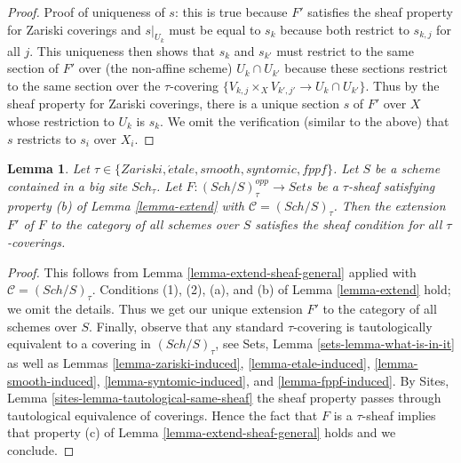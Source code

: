 \documentclass{stacks-project}
\theoremstyle{plain}
\newtheorem{lemma}[subsection]{Lemma}
\theoremstyle{definition}
\theoremstyle{remark}
\numberwithin{equation}{subsection}
\def\Sch{\mathit{Sch}}
\def\etale{{\acute{e}tale}}
\begin{document}
\begin{proof}
\medskip\noindent
Proof of uniqueness of $s$: this is true because $F'$ satisfies
the sheaf property for Zariski coverings and $s|_{U_k}$ must be equal
to $s_k$ because both restrict to $s_{k, j}$ for all $j$.
This uniqueness then shows that $s_k$ and $s_{k'}$ must restrict
to the same section of $F'$ over (the non-affine scheme) $U_k \cap U_{k'}$
because these sections restrict to the same section over the
$\tau$-covering $\{V_{k, j} \times_X V_{k', j'} \to U_k \cap U_{k'}\}$.
Thus by the sheaf property for Zariski coverings, there is a unique
section $s$ of $F'$ over $X$ whose restriction to $U_k$ is $s_k$.
We omit the verification (similar to the above) that $s$ restricts
to $s_i$ over $X_i$.
\end{proof}

\begin{lemma}
\label{lemma-extend-sheaf}
Let $\tau \in \{Zariski, \etale, smooth, syntomic, fppf\}$.
Let $S$ be a scheme contained in a big site $\Sch_\tau$.
Let $F : (\Sch/S)_\tau^{opp} \to \textit{Sets}$ be a $\tau$-sheaf
satisfying property (b) of Lemma \ref{lemma-extend} with
$\mathcal{C} = (\Sch/S)_\tau$. Then the extension
$F'$ of $F$ to the category of all schemes over $S$
satisfies the sheaf condition for all $\tau$-coverings.
\end{lemma}

\begin{proof}
This follows from Lemma \ref{lemma-extend-sheaf-general}
applied with $\mathcal{C} = (\Sch/S)_\tau$.
Conditions (1), (2), (a), and (b) of Lemma \ref{lemma-extend}
hold; we omit the details. Thus we get our unique extension $F'$
to the category of all schemes over $S$. Finally, observe that
any standard $\tau$-covering is tautologically equivalent to a
covering in $(\Sch/S)_\tau$, see Sets, Lemma \ref{sets-lemma-what-is-in-it}
as well as Lemmas \ref{lemma-zariski-induced},
\ref{lemma-etale-induced},
\ref{lemma-smooth-induced},
\ref{lemma-syntomic-induced}, and
\ref{lemma-fppf-induced}. By
Sites, Lemma \ref{sites-lemma-tautological-same-sheaf}
the sheaf property passes through tautological equivalence
of coverings. Hence the fact that $F$ is a $\tau$-sheaf implies
that property (c) of Lemma \ref{lemma-extend-sheaf-general} holds
and we conclude.
\end{proof}









\end{document}
